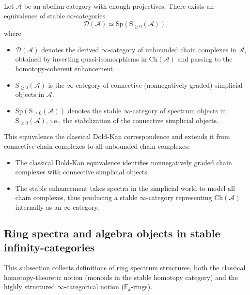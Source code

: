 \begin{theorem}
    Let $\mathcal{A}$ be an abelian category with enough projectives. There exists an equivalence of stable $\infty$-categories
    $$\mathcal{D}(\mathcal{A}) \simeq \mathrm{Sp}(\mathrm{S}_{\geq 0}(\mathcal{A})),$$
    where
    \begin{itemize}
        \item $\mathcal{D}(\mathcal{A})$ denotes the derived $\infty$-category of unbounded chain complexes in $\mathcal{A}$, obtained by inverting quasi-isomorphisms in $\mathrm{Ch}(\mathcal{A})$ and passing to the homotopy-coherent enhancement.
        \item $\mathrm{S}_{\geq 0}(\mathcal{A})$ is the $\infty$-category of connective (nonnegatively graded) simplicial objects in $\mathcal{A}$.
        \item $\mathrm{Sp}(\mathrm{S}_{\geq 0}(\mathcal{A}))$ denotes the stable $\infty$-category of spectrum objects in $\mathrm{S}_{\geq 0}(\mathcal{A})$, i.e., the stabilization of the connective simplicial objects.
    \end{itemize}

    This equivalence  the classical Dold-Kan correspondence and extends it from connective chain complexes to all unbounded chain complexes:
    \begin{itemize}
        \item The classical Dold-Kan equivalence identifies nonnegatively graded chain complexes with connective simplicial objects.
        \item The stable enhancement takes spectra in the simplicial world to model all chain complexes, thus producing a stable $\infty$-category representing $\mathrm{Ch}(\mathcal{A})$ internally as an $\infty$-category.
    \end{itemize}
\end{theorem}

\subsection{Ring spectra and algebra objects in stable infinity-categories}

This subsection collects definitions of ring spectrum structures, both the classical homotopy-theoretic notion (monoids in the stable homotopy category) and the highly structured $\infty$-categorical notion ($\mathbb{E}_k$-rings).


